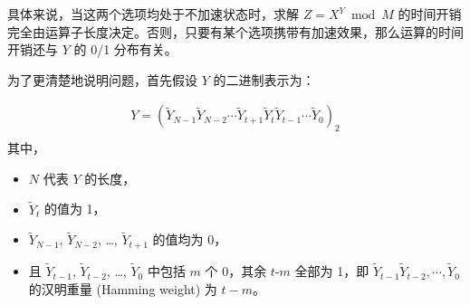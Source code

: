 \documentclass[main\_\_CN.tex]{subfiles}
\begin{document}
具体来说，当这两个选项均处于不加速状态时，求解 \begin{math}Z = X^{Y} \bmod M\end{math} 的时间开销完全由运算子长度决定。否则，只要有某个选项携带有加速效果，那么运算的时间开销还与 \begin{math}Y\end{math} 的 0/1 分布有关。

为了更清楚地说明问题，首先假设 \begin{math}Y \end{math} 的二进制表示为：

\begin{gather*}
Y = ( \widetilde{Y}_{N-1} \widetilde{Y}_{N-2} \cdots \widetilde{Y}_{t+1} \widetilde{Y}_{t} \widetilde{Y}_{t-1} \cdots \widetilde{Y}_{0} )_{2} \\
\end{gather*}
其中，
\begin{itemize}
    \item \begin{math} N \end{math} 代表 \begin{math}Y \end{math} 的长度，
    \item \begin{math}\widetilde{Y}_{t}\end{math} 的值为 1，
    \item \begin{math}\widetilde{Y}_{N-1}\end{math}, \begin{math}\widetilde{Y}_{N-2}\end{math}, \dots, \begin{math}\widetilde{Y}_{t+1}\end{math} 的值均为 0，
    \item 且 \begin{math}\widetilde{Y}_{t-1}\end{math}, \begin{math}\widetilde{Y}_{t-2}\end{math}, \dots, \begin{math}\widetilde{Y}_{0}\end{math} 中包括 \begin{math}m\end{math} 个 0，其余 \begin{math}t\end{math}-\begin{math}m\end{math} 全部为 1，即 \begin{math}\widetilde{Y}_{t-1} \widetilde{Y}_{t-2}, \cdots, \widetilde{Y}_{0}\end{math} 的汉明重量 (Hamming weight) 为 \begin{math}t -m\end{math}。
\end{itemize}
\end{document}

